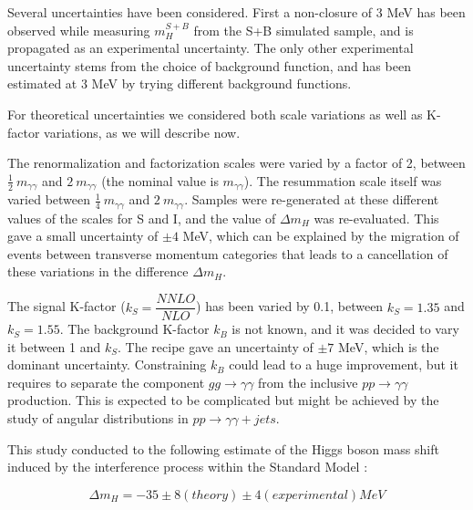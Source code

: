 Several uncertainties have been considered. First a non-closure of 3 MeV has been observed while measuring $m_H^{S+B}$ from the S+B simulated sample, and is propagated as an experimental uncertainty. The only other experimental uncertainty stems from the choice of background function, and has been estimated at 3 MeV by trying different background functions.

For theoretical uncertainties we considered both scale variations as well as K-factor variations, as we will describe now.

The renormalization and factorization scales were varied by a factor of 2, between $\frac{1}{2}~m_{\gamma\gamma}$ and $2~m_{\gamma\gamma}$ (the nominal value is $m_{\gamma\gamma}$). The resummation scale itself was varied between $\frac{1}{4}~m_{\gamma\gamma}$ and $2~m_{\gamma\gamma}$. Samples were re-generated at these different values of the scales for S and I, and the value of $\Delta m_H$ was re-evaluated. This gave a small uncertainty of $\pm 4$ MeV, which can be explained by the migration of events between transverse momentum categories that leads to a cancellation of these variations in the difference $\Delta m_H$.

The signal K-factor ($k_S = \dfrac{NNLO}{NLO}$) has been varied by 0.1, between $k_S = 1.35$ and $k_S = 1.55$. The background K-factor $k_B$ is not known, and it was decided to vary it between 1 and $k_S$. The recipe gave an uncertainty of $\pm 7$ MeV, which is the dominant uncertainty. Constraining $k_B$ could lead to a huge improvement, but it requires to separate the component $gg \rightarrow \gamma\gamma$ from the inclusive $pp \rightarrow \gamma\gamma$ production. This is expected to be complicated but might be achieved by the study of angular distributions in $pp \rightarrow \gamma\gamma+jets$.

This study conducted to the following estimate of the Higgs boson mass shift induced by the interference process within the Standard Model :

\begin{equation}
    \Delta m_H = -35 \pm 8 (theory) \pm 4 (experimental) MeV
\end{equation}

